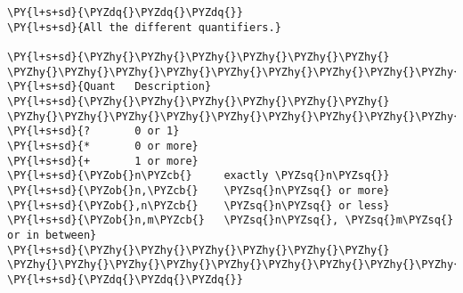 

\section*{}

\begin{Verbatim}[commandchars=\\\{\}]
\PY{l+s+sd}{\PYZdq{}\PYZdq{}\PYZdq{}}
\PY{l+s+sd}{All the different quantifiers.}

\PY{l+s+sd}{\PYZhy{}\PYZhy{}\PYZhy{}\PYZhy{}\PYZhy{}\PYZhy{}  \PYZhy{}\PYZhy{}\PYZhy{}\PYZhy{}\PYZhy{}\PYZhy{}\PYZhy{}\PYZhy{}\PYZhy{}\PYZhy{}\PYZhy{}\PYZhy{}\PYZhy{}\PYZhy{}\PYZhy{}\PYZhy{}\PYZhy{}\PYZhy{}\PYZhy{}\PYZhy{}\PYZhy{}\PYZhy{}}
\PY{l+s+sd}{Quant   Description}
\PY{l+s+sd}{\PYZhy{}\PYZhy{}\PYZhy{}\PYZhy{}\PYZhy{}\PYZhy{}  \PYZhy{}\PYZhy{}\PYZhy{}\PYZhy{}\PYZhy{}\PYZhy{}\PYZhy{}\PYZhy{}\PYZhy{}\PYZhy{}\PYZhy{}\PYZhy{}\PYZhy{}\PYZhy{}\PYZhy{}\PYZhy{}\PYZhy{}\PYZhy{}\PYZhy{}\PYZhy{}\PYZhy{}\PYZhy{}}
\PY{l+s+sd}{?       0 or 1}
\PY{l+s+sd}{*       0 or more}
\PY{l+s+sd}{+       1 or more}
\PY{l+s+sd}{\PYZob{}n\PYZcb{}     exactly \PYZsq{}n\PYZsq{}}
\PY{l+s+sd}{\PYZob{}n,\PYZcb{}    \PYZsq{}n\PYZsq{} or more}
\PY{l+s+sd}{\PYZob{},n\PYZcb{}    \PYZsq{}n\PYZsq{} or less}
\PY{l+s+sd}{\PYZob{}n,m\PYZcb{}   \PYZsq{}n\PYZsq{}, \PYZsq{}m\PYZsq{} or in between}
\PY{l+s+sd}{\PYZhy{}\PYZhy{}\PYZhy{}\PYZhy{}\PYZhy{}\PYZhy{}  \PYZhy{}\PYZhy{}\PYZhy{}\PYZhy{}\PYZhy{}\PYZhy{}\PYZhy{}\PYZhy{}\PYZhy{}\PYZhy{}\PYZhy{}\PYZhy{}\PYZhy{}\PYZhy{}\PYZhy{}\PYZhy{}\PYZhy{}\PYZhy{}\PYZhy{}\PYZhy{}\PYZhy{}\PYZhy{}}
\PY{l+s+sd}{\PYZdq{}\PYZdq{}\PYZdq{}}
\end{Verbatim}

